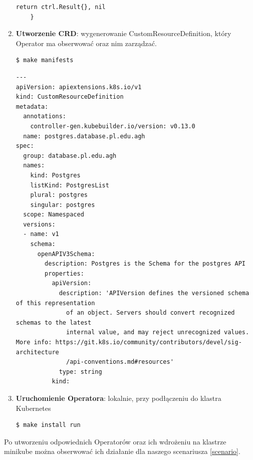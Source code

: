 \documentclass[polish]{aghengthesis}
\begin{document}
\begin{enumerate}
\begin{lstlisting}[caption=fragment kontrolera dla PostgreSQL]
    	return ctrl.Result{}, nil
    }
\end{lstlisting}

\newpage

\item \textbf{Utworzenie CRD}: wygenerowanie CustomResourceDefinition, który Operator ma obserwować oraz nim zarządzać.
\begin{lstlisting}[basicstyle=\ttfamily, numbers=none]
$ make manifests\end{lstlisting}\vspace{-20pt}

\begin{lstlisting}[caption=Fragment CRD dla PostgreSQL]
---
apiVersion: apiextensions.k8s.io/v1
kind: CustomResourceDefinition
metadata:
  annotations:
    controller-gen.kubebuilder.io/version: v0.13.0
  name: postgres.database.pl.edu.agh
spec:
  group: database.pl.edu.agh
  names:
    kind: Postgres
    listKind: PostgresList
    plural: postgres
    singular: postgres
  scope: Namespaced
  versions:
  - name: v1
    schema:
      openAPIV3Schema:
        description: Postgres is the Schema for the postgres API
        properties:
          apiVersion:
            description: 'APIVersion defines the versioned schema of this representation
              of an object. Servers should convert recognized schemas to the latest
              internal value, and may reject unrecognized values. More info: https://git.k8s.io/community/contributors/devel/sig-architecture
              /api-conventions.md#resources'
            type: string
          kind:
\end{lstlisting}

\item \textbf{Uruchomienie Operatora}: lokalnie, przy podłączeniu do klastra Kubernetes
\begin{lstlisting}[basicstyle=\ttfamily, numbers=none]
$ make install run\end{lstlisting}\vspace{-20pt}
\end{enumerate}

Po utworzeniu odpowiednich Operatorów oraz ich wdrożeniu na klastrze minikube można obserwować ich działanie dla naszego scenariusza \ref{scenario}.
\newpage
\end{document}
